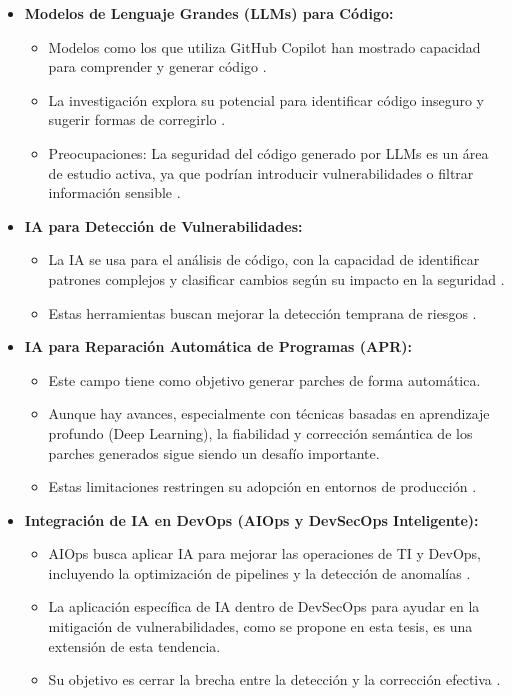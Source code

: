 \begin{itemize}
    \item \textbf{Modelos de Lenguaje Grandes (LLMs) para Código:} 
    \begin{itemize}
        \item Modelos como los que utiliza GitHub Copilot han mostrado capacidad para comprender y generar código \cite{GitHubCopilotFeatures, Wang2022CopilotSecurity}.
        \item La investigación explora su potencial para identificar código inseguro y sugerir formas de corregirlo \cite{Wang2022CopilotSecurity}.
        \item Preocupaciones: La seguridad del código generado por LLMs es un área de estudio activa, ya que podrían introducir vulnerabilidades o filtrar información sensible \cite{GitGuardian2025CopilotConcerns}.
    \end{itemize}
    
    \item \textbf{IA para Detección de Vulnerabilidades:}
    \begin{itemize}
        \item La IA se usa para el análisis de código, con la capacidad de identificar patrones complejos y clasificar cambios según su impacto en la seguridad \cite{GitHubAICodeReviews}.
        \item Estas herramientas buscan mejorar la detección temprana de riesgos \cite{GitHubAICodeReviews}.
    \end{itemize}
    
    \item \textbf{IA para Reparación Automática de Programas (APR):}
    \begin{itemize}
        \item Este campo tiene como objetivo generar parches de forma automática.
        \item Aunque hay avances, especialmente con técnicas basadas en aprendizaje profundo (Deep Learning), la fiabilidad y corrección semántica de los parches generados sigue siendo un desafío importante.
        \item Estas limitaciones restringen su adopción en entornos de producción \cite{Liu2024APRSurvey}.
    \end{itemize}
    
    \item \textbf{Integración de IA en DevOps (AIOps y DevSecOps Inteligente):}
    \begin{itemize}
        \item AIOps busca aplicar IA para mejorar las operaciones de TI y DevOps, incluyendo la optimización de pipelines y la detección de anomalías \cite{Iglesia2021AIOps}.
        \item La aplicación específica de IA dentro de DevSecOps para ayudar en la mitigación de vulnerabilidades, como se propone en esta tesis, es una extensión de esta tendencia.
        \item Su objetivo es cerrar la brecha entre la detección y la corrección efectiva \cite{Myrbakken2019DevSecOpsSLR, Kumar2022DevSecOpsReview}.
    \end{itemize}
\end{itemize}

